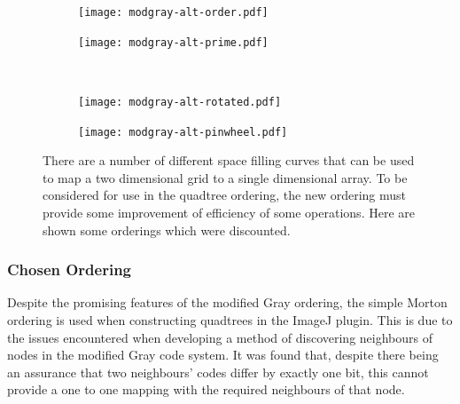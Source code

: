\begin{figure}[tbh]
	\centering
	\begin{subfigure}[b]{3.5cm}
		\texttt{[image: modgray-alt-order.pdf]}
		\caption{}\label{fig:modgray-alt-order.pdf}
	\end{subfigure}%
	\quad
	\begin{subfigure}[b]{3.5cm}
		\texttt{[image: modgray-alt-prime.pdf]}
		\caption{}\label{fig:modgray-alt-prime.pdf}
	\end{subfigure}
	\\[0.2cm]
	\begin{subfigure}[b]{3.5cm}
		\texttt{[image: modgray-alt-rotated.pdf]}
		\caption{}\label{fig:modgray-alt-rotated.pdf}
	\end{subfigure}%
	\quad
	\begin{subfigure}[b]{3.5cm}
		\texttt{[image: modgray-alt-pinwheel.pdf]}
		\caption{}\label{fig:modgray-alt-pinwheel.pdf}
	\end{subfigure}

	\caption[Alternative quadtree orderings.]{There are a number of different
		space filling curves that can be used to map a two dimensional grid to
		a single dimensional array. To be considered for use in the quadtree
		ordering, the new ordering must provide some improvement of efficiency
		of some operations. Here are shown some orderings which were
		discounted.}\label{fig:modgray-2-alternatives}
\end{figure}

\subsubsection{Chosen Ordering}
\label{ssub:Chosen Ordering}

Despite the promising features of the modified Gray ordering, the simple Morton
ordering is used when constructing quadtrees in the ImageJ plugin. This is due
to the issues encountered when developing a method of discovering neighbours of
nodes in the modified Gray code system. It was found that, despite there being
an assurance that two neighbours' codes differ by exactly one bit, this cannot
provide a one to one mapping with the required neighbours of that node.

